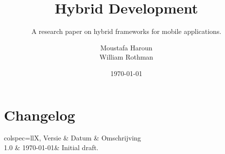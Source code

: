 \documentclass[fleqn,12pt]{article}
\title{Hybrid Development}
\subtitle{A research paper on hybrid frameworks for mobile applications.}
\author{Moustafa Haroun\\William Rothman} %
\date{\today}
\begin{document}
\maketitle

\newpage
\section{Changelog}\label{sec:changelog}

\begin{htable}[
		caption = {Changelog},
		label = {tab:changelog},
	]{
		colspec={llX},
	}
	Versie & Datum & Omschrijving \\
	1.0 & \today & Initial draft. \\
\end{htable}

\newpage
\tableofcontents

\newpage










\newpage
\printbibliography
\end{document}
